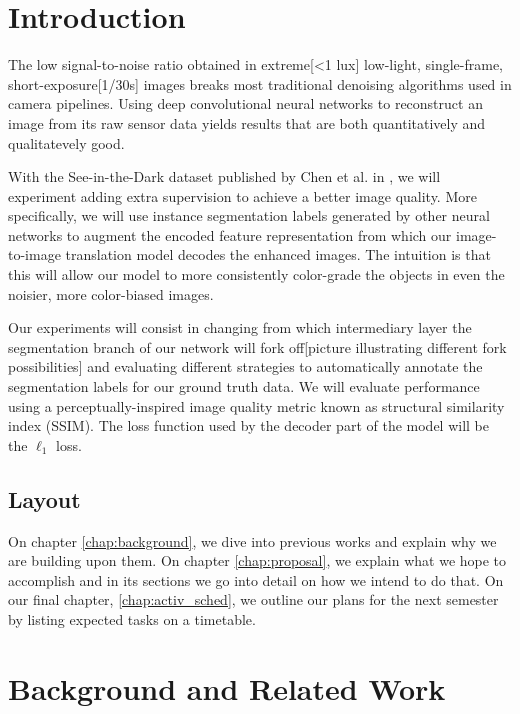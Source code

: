
\chapter{Introduction}

The low signal-to-noise ratio obtained in extreme[<1 lux] low-light, single-frame, short-exposure[1/30s] images breaks most traditional denoising algorithms used in camera pipelines.
Using deep convolutional neural networks to reconstruct an image from its raw sensor data yields results that are both quantitatively and qualitatevely good.

With the See-in-the-Dark dataset published by Chen et al. in \cite{DBLP:conf/cvpr/ChenCXK18:lsid}, we will experiment adding extra supervision to achieve a better image quality.
More specifically, we will use instance segmentation labels generated by other neural networks to augment the encoded feature representation from which our image-to-image translation model decodes the enhanced images.
The intuition is that this will allow our model to more consistently color-grade the objects in even the noisier, more color-biased images.

Our experiments will consist in changing from which intermediary layer the segmentation branch of our network will fork off[picture illustrating different fork possibilities] and evaluating different strategies to automatically annotate the segmentation labels for our ground truth data.
We will evaluate performance using a perceptually-inspired image quality metric known as structural similarity index (SSIM).
The loss function used by the decoder part of the model will be the \( \ell_1 \) loss.


\section{Layout}

On chapter \ref{chap:background}, we dive into previous works and explain why we are building upon them.
On chapter \ref{chap:proposal}, we explain what we hope to accomplish and in its sections we go into detail on how we intend to do that.
On our final chapter, \ref{chap:activ_sched}, we outline our plans for the next semester by listing expected tasks on a timetable.


\chapter{\label{chap:background}Background and Related Work}

